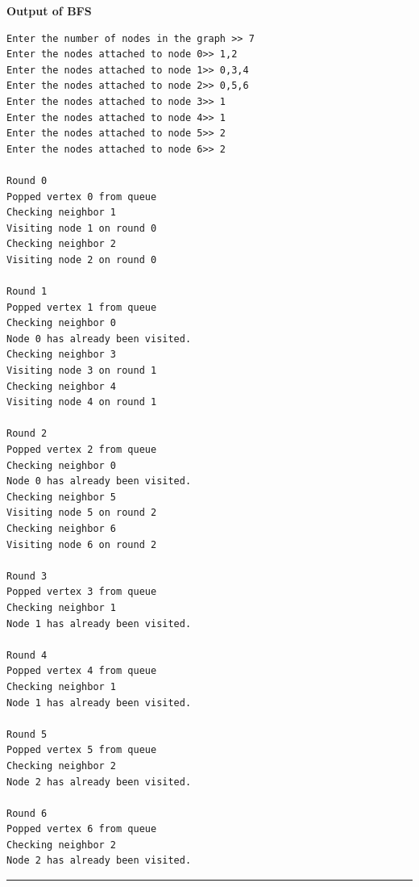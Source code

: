 \documentclass{article}
\begin{document}
\textbf{Output of BFS}
\begin{lstlisting}
Enter the number of nodes in the graph >> 7
Enter the nodes attached to node 0>> 1,2
Enter the nodes attached to node 1>> 0,3,4
Enter the nodes attached to node 2>> 0,5,6
Enter the nodes attached to node 3>> 1   
Enter the nodes attached to node 4>> 1
Enter the nodes attached to node 5>> 2
Enter the nodes attached to node 6>> 2

Round 0
Popped vertex 0 from queue
Checking neighbor 1
Visiting node 1 on round 0
Checking neighbor 2
Visiting node 2 on round 0

Round 1
Popped vertex 1 from queue
Checking neighbor 0
Node 0 has already been visited.
Checking neighbor 3
Visiting node 3 on round 1
Checking neighbor 4
Visiting node 4 on round 1

Round 2
Popped vertex 2 from queue
Checking neighbor 0
Node 0 has already been visited.
Checking neighbor 5
Visiting node 5 on round 2
Checking neighbor 6
Visiting node 6 on round 2

Round 3
Popped vertex 3 from queue
Checking neighbor 1
Node 1 has already been visited.

Round 4
Popped vertex 4 from queue
Checking neighbor 1
Node 1 has already been visited.

Round 5
Popped vertex 5 from queue
Checking neighbor 2
Node 2 has already been visited.

Round 6
Popped vertex 6 from queue
Checking neighbor 2
Node 2 has already been visited.

\end{lstlisting}

\noindent\rule{8cm}{0.4pt}
\end{document}
